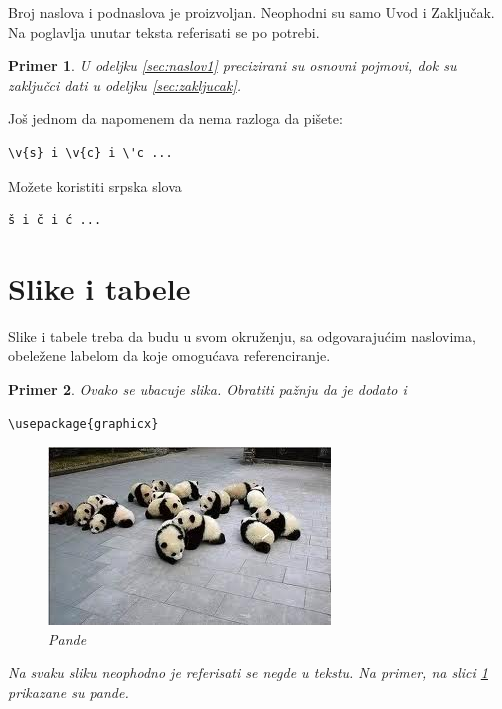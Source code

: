\documentclass[a4paper]{article}
\newtheorem{primer}{Primer}[section]
\begin{document}
Broj naslova i podnaslova je proizvoljan. Neophodni su samo Uvod i Zaključak. Na poglavlja unutar teksta referisati se po potrebi. 
\begin{primer}
U odeljku \ref{sec:naslov1} precizirani su osnovni pojmovi, dok su zaključci dati u odeljku \ref{sec:zakljucak}.
\end{primer}

Još jednom da napomenem da nema razloga da pišete:
\begin{verbatim}
\v{s} i \v{c} i \'c ...
\end{verbatim}
Možete koristiti srpska slova
\begin{verbatim}
š i č i ć ... 
\end{verbatim}



\section{Slike i tabele}
\label{slike_i_tabele}

Slike i tabele treba da budu u svom okruženju, sa odgovarajućim naslovima, obeležene labelom da koje omogućava referenciranje. 

\begin{primer} Ovako se ubacuje slika. Obratiti pažnju da je dodato i 
\begin{verbatim}
\usepackage{graphicx}
\end{verbatim}

\begin{figure}[h!]
\begin{center}
\includegraphics[scale=0.75]{panda.jpg}
\end{center}
\caption{Pande}
\label{fig:pande}
\end{figure}

Na svaku sliku neophodno je referisati se negde u tekstu. Na primer, na slici \ref{fig:pande} prikazane su pande. 
\end{primer}
\end{document}
